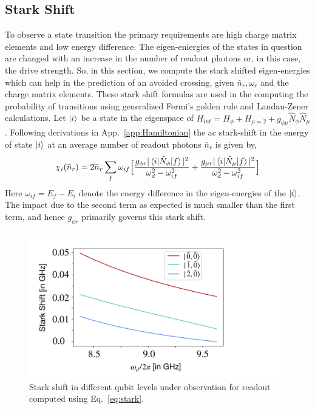 \documentclass[%
reprint,
superscriptaddress,
 amsmath,amssymb,
 aps,
 prx,
longbibliography,
floatfix,
]{revtex4-2}
\begin{document}
\subsection{Stark Shift}\label{app:stark-shift}
To observe a state transition the primary requirements are high charge matrix elements and low energy difference. The eigen-eniergies of the states in question are changed with an increase in the number of readout photons or, in this case, the drive strength. So, in this section, we compute the stark shifted eigen-energies which can help in the prediction of an avoided crossing, given $\bar n_r, \omega_r$ and the charge matrix elements. These stark shift formulas are used in the computing the probability of transitions using generalized Fermi's golden rule and Landau-Zener calculations. Let $\ket{i}$ be a state in the eigenspace of $H_{int}=H_\phi+H_{\mu=2}+g_{\phi\mu}\hat N_\phi\hat N_\mu$. Following derivations in App.~\ref{app:Hamiltonian} the ac stark-shift in the energy of state $\ket{i}$ at an average number of readout photons $\bar n_r$ is given by,
\begin{align}
    \chi_i(\bar n_r)=2\bar n_r\sum_{f}\omega_{if}\Big[\frac{g_{\phi r}|\braket{i|\hat N_\phi|f}|^2}{\omega_d^2-\omega_{if}^2}+\frac{g_{\mu r}|\braket{i|\hat N_\mu|f}|^2}{\omega_d^2-\omega_{if}^2}\Big]\label{eq:stark}
\end{align}
 Here $\omega_{if}=E_f-E_i$ denote the energy difference in the eigen-energies of the $\ket{i}$. The impact due to the second term as expected is much smaller than the first term, and hence $g_{\phi r}$ primarily governs this stark shift.
 \begin{figure}
     \centering
     \includegraphics[width=\linewidth]{Figures/Stark-shift.pdf}
     \caption{Stark shift in different qubit levels under observation for readout computed using Eq.~\ref{eq:stark}.}
     \label{fig:stark-shift}
 \end{figure}
\end{document}
